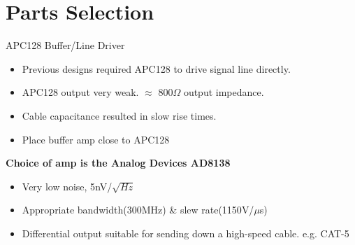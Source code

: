 \documentclass{beamer}
\begin{document}
\section{Parts Selection}
\begin{frame}{APC128 Buffer/Line Driver}
  \centering
  \begin{itemize}
    \item Previous designs required APC128 to drive signal line directly.
    \item APC128 output very weak. $\approx$ \unit{800}{$\Omega$} output impedance.
    \item Cable capacitance resulted in slow rise times.
    \item Place buffer amp close to APC128
  \end{itemize}
  \textbf{Choice of amp is the Analog Devices AD8138}
  \begin{itemize}
    \item Very low noise, \unit{5}{nV}/$\sqrt{Hz}$
    \item Appropriate bandwidth(\unit{300}{MHz}) \& slew rate(\unit{1150}{V/$\mu$s})
    \item Differential output suitable for sending down a high-speed cable. e.g. CAT-5
  \end{itemize}
\end{frame}
\end{document}
